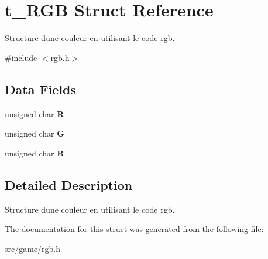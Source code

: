 \hypertarget{structt___r_g_b}{}\section{t\+\_\+\+R\+GB Struct Reference}
\label{structt___r_g_b}


Structure d\textquotesingle{}une couleur en utilisant le code rgb.  




{\ttfamily \#include $<$rgb.\+h$>$}

\subsection*{Data Fields}
\begin{DoxyCompactItemize}
\item 
\mbox{\label{structt___r_g_b_a99b994edd82192c4fe92f1699f3c1085}} 
unsigned char {\bfseries R}
\item 
\mbox{\label{structt___r_g_b_a9ceb27cca5e312d4e16505213eb76661}} 
unsigned char {\bfseries G}
\item 
\mbox{\label{structt___r_g_b_a8c81a457ae49e23c5e69f9d79bbd1131}} 
unsigned char {\bfseries B}
\end{DoxyCompactItemize}


\subsection{Detailed Description}
Structure d\textquotesingle{}une couleur en utilisant le code rgb. 

The documentation for this struct was generated from the following file\+:\begin{DoxyCompactItemize}
\item 
src/game/rgb.\+h\end{DoxyCompactItemize}
